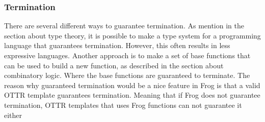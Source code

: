 \subsubsection{Termination}
There are several different ways to guarantee termination. As mention in the section about type theory, 
it is possible to make a type system for a programming language that guarantees termination. However, this often results in less expressive languages. 
Another approach is to make a set of base functions that can be used to build a new function, as described in the section about combinatory logic. 
Where the base functions are guaranteed to terminate. The reason why guaranteed termination would be a nice feature in Frog is that a valid OTTR template guarantees termination. 
Meaning that if Frog does not guarantee termination, OTTR templates that uses Frog functions can not guarantee it either

